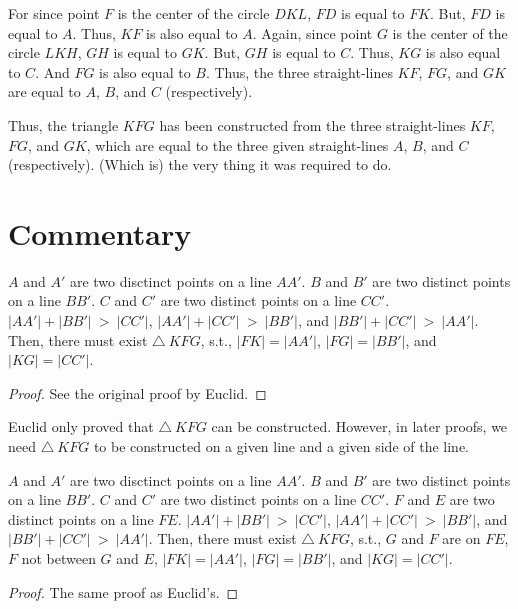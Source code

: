 For since point $F$ is the center of the circle $DKL$, $FD$ is equal to $FK$.
But, $FD$ is equal to $A$. Thus, $KF$ is also equal to $A$. Again, since point
$G$ is the center of the circle $LKH$, $GH$ is equal to $GK$. But, $GH$ is equal
to $C$. Thus, $KG$ is also equal to $C$. And $FG$ is also equal to $B$. Thus,
the three straight-lines $KF$, $FG$, and $GK$ are equal to $A$, $B$, and $C$ (respectively).

Thus, the triangle $KFG$ has been constructed from the three straight-lines
$KF$, $FG$, and $GK$, which are equal to the three given straight-lines
$A$, $B$, and $C$ (respectively). (Which is) the very thing it was required
to do.


\section*{Commentary}

\begin{proposition}\label{proposition_22}\leanok
    $A$ and $A'$ are two disctinct points on a line $AA'$. $B$ and $B'$ are two distinct points on a line $BB'$. $C$ and $C'$ are two distinct points on a line $CC'$. $|AA'| + |BB'|~>~|CC'|$, $|AA'| + |CC'|~>~|BB'|$, and $|BB'| + |CC'|~>~|AA'|$. Then, there must exist $\triangle~KFG$, s.t., $|FK| = |AA'|$, $|FG| = |BB'|$, and $|KG| = |CC'|$.
\end{proposition}
\begin{proof}
    \leanok
    See the original proof by Euclid.
\end{proof}


Euclid only proved that $\triangle~KFG$ can be constructed. However, in later proofs, we need $\triangle~KFG$ to be constructed on a given line and a given side of the line.

\begin{proposition}\label{proposition_22'}\leanok
    $A$ and $A'$ are two disctinct points on a line $AA'$. $B$ and $B'$ are two distinct points on a line $BB'$. $C$ and $C'$ are two distinct points on a line $CC'$. $F$ and $E$ are two distinct points on a line $FE$. $|AA'| + |BB'|~>~|CC'|$, $|AA'| + |CC'|~>~|BB'|$, and $|BB'| + |CC'|~>~|AA'|$. Then, there must exist $\triangle~KFG$, s.t., $G$ and $F$ are on $FE$, $F$ not between $G$ and $E$, $|FK| = |AA'|$, $|FG| = |BB'|$, and $|KG| = |CC'|$.
\end{proposition}
\begin{proof}
    \leanok
    The same proof as Euclid's.
\end{proof}

